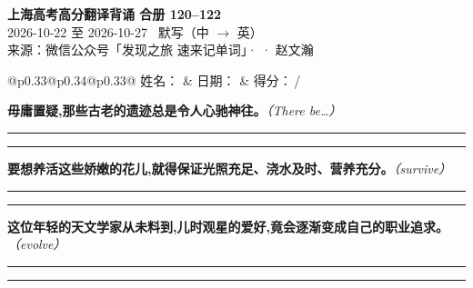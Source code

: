\documentclass[11pt,a4paper]{article}
\newcommand{\num}[1]{\makebox[1.9em][r]{#1.}\hspace{0.3em}}
\newcommand{\wline}{\noindent\rule{\linewidth}{0.4pt}}
\newcommand{\prompt}[1]{\emph{\textcolor{tipblue}{\small（#1）}}}
\begin{document}
\pagestyle{plain}
\begin{center}
{\LARGE\bfseries 上海高考高分翻译背诵 \quad 合册 120–122}\\[0.25em]
{\large 2026-10-22 至 2026-10-27 \quad\ 默写（中 $\to$ 英）}\\[0.35em]
{\footnotesize 来源：微信公众号「发现之旅 速来记单词」·  · 赵文瀚}
\end{center}

\vspace{0.4em}
\noindent\begin{tabular}{@{}p{0.33\textwidth}@{}p{0.34\textwidth}@{}p{0.33\textwidth}@{}}
姓名：\underline{\hspace{2.0cm}} & 日期：\underline{\hspace{2.0cm}} & 得分：\underline{\hspace{1.4cm}}\,/ \\
\end{tabular}

\vspace{0.5em}

\vspace{0.8em}
\vspace{0.35em}\vspace{0.15em}

\begin{minipage}{\linewidth}

\num{1}\textbf{毋庸置疑,那些古老的遗迹总是令人心驰神往。}\prompt{There be…}

\vspace{0.3em}

\wline\vspace{0.3em}
\wline

\end{minipage}

\begin{minipage}{\linewidth}

\num{2}\textbf{要想养活这些娇嫩的花儿,就得保证光照充足、浇水及时、营养充分。}\prompt{survive}

\vspace{0.3em}

\wline\vspace{0.3em}
\wline

\end{minipage}

\begin{minipage}{\linewidth}

\num{3}\textbf{这位年轻的天文学家从未料到,儿时观星的爱好,竟会逐渐变成自己的职业追求。}\prompt{evolve}

\vspace{0.3em}

\wline\vspace{0.3em}
\wline

\end{minipage}
\end{document}
